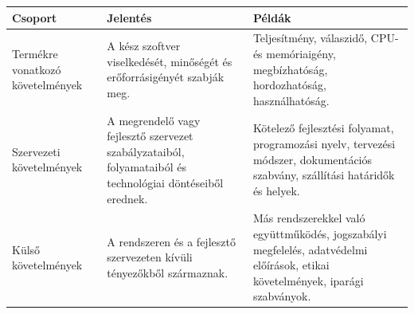 \begin{tabularx}{\textwidth}{L{34mm}X X}
\toprule
\textbf{Csoport} & \textbf{Jelentés} & \textbf{Példák} \\
\midrule
Termékre vonatkozó követelmények & A kész szoftver viselkedését, minőségét és erőforrásigényét szabják meg. & Teljesítmény, válaszidő, CPU- és memóriaigény, megbízhatóság, hordozhatóság, használhatóság. \\
Szervezeti követelmények & A megrendelő vagy fejlesztő szervezet szabályzataiból, folyamataiból és technológiai döntéseiből erednek. & Kötelező fejlesztési folyamat, programozási nyelv, tervezési módszer, dokumentációs szabvány, szállítási határidők és helyek. \\
Külső követelmények & A rendszeren és a fejlesztő szervezeten kívüli tényezőkből származnak. & Más rendszerekkel való együttműködés, jogszabályi megfelelés, adatvédelmi előírások, etikai követelmények, iparági szabványok. \\
\bottomrule
\end{tabularx}
